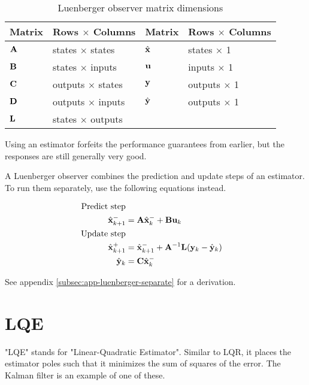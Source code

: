 \begin{table}[ht]
  \renewcommand{\arraystretch}{1.5}
  \centering
  \begin{tabular}{|ll|ll|}
    \hline
    \rowcolor{headingbg}
    \textbf{Matrix} & \textbf{Rows $\times$ Columns} &
    \textbf{Matrix} & \textbf{Rows $\times$ Columns} \\
    \hline
    $\mathbf{A}$ & states $\times$ states & $\hat{\mathbf{x}}$ & states $\times$ 1 \\
    $\mathbf{B}$ & states $\times$ inputs & $\mathbf{u}$ & inputs $\times$ 1 \\
    $\mathbf{C}$ & outputs $\times$ states & $\mathbf{y}$ & outputs $\times$ 1 \\
    $\mathbf{D}$ & outputs $\times$ inputs & $\hat{\mathbf{y}}$ & outputs $\times$ 1 \\
    $\mathbf{L}$ & states $\times$ outputs &  &  \\
    \hline
  \end{tabular}
  \caption{Luenberger observer matrix dimensions}
  \label{tab:luenberger_matrix_dims}
\end{table}

Using an estimator forfeits the performance guarantees from earlier, but the
responses are still generally very good.

A Luenberger observer combines the prediction and update steps of an estimator.
To run them separately, use the following equations instead.

\begin{align}
  \text{Predict step} \nonumber \\
  \hat{\mathbf{x}}_{k+1}^- &= \mathbf{A}\hat{\mathbf{x}}_k^- + \mathbf{B}\mathbf{u}_k \\
  \text{Update step} \nonumber \\
  \hat{\mathbf{x}}_{k+1}^+ &= \hat{\mathbf{x}}_{k+1}^- + \mathbf{A}^{-1}\mathbf{L}
    (\mathbf{y}_k - \hat{\mathbf{y}}_k) \\
  \hat{\mathbf{y}}_k &= \mathbf{C} \hat{\mathbf{x}}_k^-
\end{align}

See appendix \ref{subsec:app-luenberger-separate} for a derivation.

\section{LQE}

"LQE" stands for "Linear-Quadratic Estimator". Similar to LQR, it places the
estimator poles such that it minimizes the sum of squares of the error. The
Kalman filter is an example of one of these.

